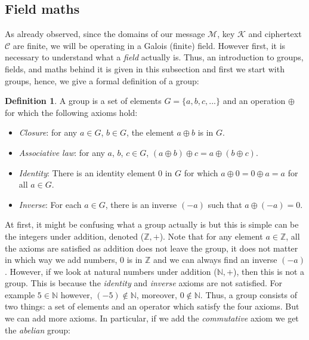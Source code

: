 \documentclass{Resources/UoBLab1}
\theoremstyle{definition}
\newtheorem{definition}[theorem]{Definition}
\begin{document}

\subsection{Field maths}
As already observed, since the domains of our message $\mathcal{M}$, key $\mathcal{K}$ and ciphertext $\mathcal{C}$ are finite, we will be operating in a Galois (finite) field. However first, it is necessary to understand what a \textit{field} actually is. Thus, an introduction to groups, fields, and maths behind it is given in this subsection and first we start with groups, hence, we give a formal definition of a group:
\begin{definition}
    A group is a set of elements $G = \{a, b, c, ...\}$ and an operation $\oplus$ for which the following axioms hold:
    \begin{itemize}
        \item \textit{Closure}: for any $a \in G$, $b \in G$, the element $a \oplus b$ is in $G$.
        \item \textit{Associative law}: for any $a$, $b$, $c \in G$, $(a \oplus b) \oplus c = a \oplus (b \oplus c)$.
        \item \textit{Identity}: There is an identity element $0$ in $G$ for which $a \oplus 0 = 0 \oplus a = a$ for all $a \in G$.
        \item \textit{Inverse}: For each $a \in G$, there is an inverse $(-a)$ such that $a \oplus (-a) = 0$.
    \end{itemize}
\end{definition}
At first, it might be confusing what a group actually is but this is simple can be the integers under addition, denoted ($\mathbb{Z}, +$). Note that for any element $a \in \mathbb{Z}$, all the axioms are satisfied as addition does not leave the group, it does not matter in which way we add numbers, $0$ is in $\mathbb{Z}$ and we can always find an inverse $(-a)$. However, if we look at natural numbers under addition ($\mathbb{N}, +$), then this is not a group. This is because the \textit{identity} and \textit{inverse} axioms are not satisfied. For example $5 \in \mathbb{N}$ however, $(-5) \notin \mathbb{N}$, moreover, $0 \notin \mathbb{N}$. Thus, a group consists of two things: a set of elements and an operator which satisfy the four axioms. But we can add more axioms. In particular, if we add the \textit{commutative} axiom we get the \textit{abelian} group:
\end{document}
